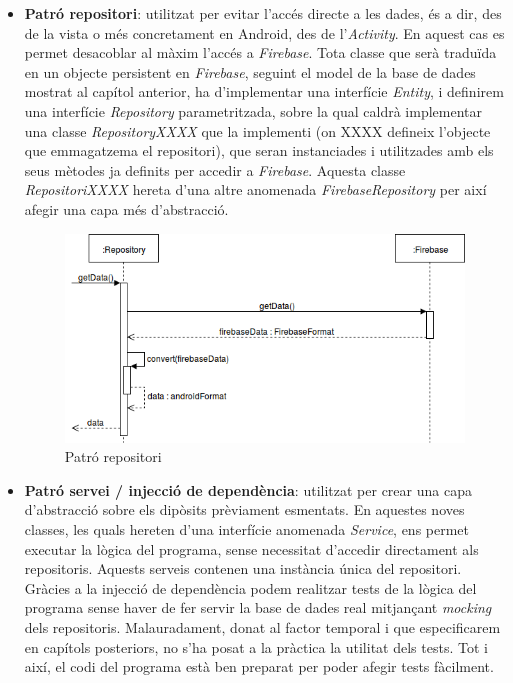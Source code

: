 \begin{itemize}
\item \textbf{Patró repositori}: utilitzat per evitar l'accés directe a les dades, és a dir, des de la vista o més concretament en Android, des de l'\textit{Activity}. En aquest cas es permet desacoblar al màxim l'accés a \textit{Firebase}. Tota classe que serà traduïda en un objecte persistent en \textit{Firebase}, seguint el model de la base de dades mostrat al capítol anterior, ha d'implementar una interfície \textit{Entity}, i definirem una interfície \textit{Repository} parametritzada, sobre la qual caldrà implementar una classe \textit{RepositoryXXXX} que la implementi (on XXXX defineix l'objecte que emmagatzema el repositori), que seran instanciades i utilitzades amb els seus mètodes ja definits per accedir a \textit{Firebase}. Aquesta classe \textit{RepositoriXXXX} hereta d'una altre anomenada \textit{FirebaseRepository} per així afegir una capa més d'abstracció.
\\
\begin{figure}[h]
\centering
\includegraphics[scale=0.6]{Figures/patro_repositori.png}
\caption{Patró repositori}
\end{figure}

\item \textbf{Patró servei / injecció de dependència}: utilitzat per crear una capa d'abstracció sobre els dipòsits prèviament esmentats. En aquestes noves classes, les quals hereten d'una interfície anomenada \textit{Service}, ens permet executar la lògica del programa, sense necessitat d'accedir directament als repositoris. Aquests serveis contenen una instància única del repositori. Gràcies a la injecció de dependència podem realitzar tests de la lògica del programa sense haver de fer servir la base de dades real mitjançant \textit{mocking} dels repositoris. Malauradament, donat al factor temporal i que especificarem en capítols posteriors, no s'ha posat a la pràctica la utilitat dels tests. Tot i així, el codi del programa està ben preparat per poder afegir tests fàcilment.


\end{itemize}

